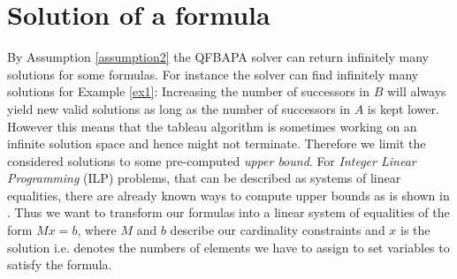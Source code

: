 \documentclass{book}
\theoremstyle{break}
\theoremstyle{definition}
\begin{document}
\section{Solution of a formula}\label{solution}
By Assumption \ref{assumption2} the QFBAPA solver can return infinitely many solutions for some formulas. For instance the solver can find infinitely many solutions for Example \ref{ex1}: Increasing the number of successors in $B$ will always yield new valid solutions as long as the number of successors in $A$ is kept lower. However this means that the tableau algorithm is sometimes working on an infinite solution space and hence might not terminate. Therefore we limit the considered solutions to some pre-computed \textit{upper bound}. For \textit{Integer Linear Programming} (ILP) problems, that can be described as systems of linear equalities, there are already known ways to compute upper bounds as is shown in \cite{knapsack}. Thus we want to transform our formulas into a linear system of equalities of the form $Mx=b$, where $M$ and $b$ describe our cardinality constraints and $x$ is the solution i.e. denotes the numbers of elements we have to assign to set variables to satisfy the formula. \\
\end{document}
